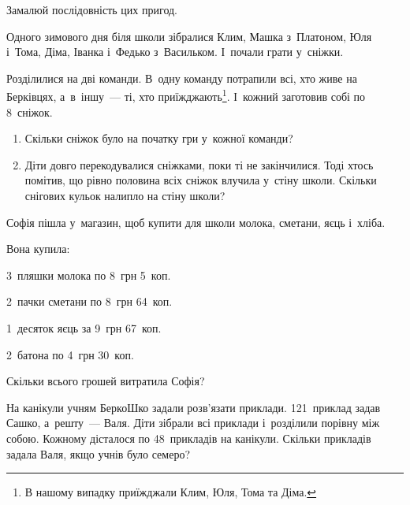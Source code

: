 Замалюй послідовність цих пригод.


\problem
Одного зимового дня біля школи зібралися Клим, Машка з~Платоном, Юля і~Тома,
Діма, Іванка і~Федько з~Васильком. І~почали грати у~сніжки.

Розділилися на дві команди. В~одну команду потрапили всі,
хто живе на Берківцях, а~в~іншу~--- ті, хто приїжджають\footnote{
    В нашому випадку приїжджали Клим, Юля, Тома та Діма.
}.
І~кожний заготовив собі по 8~сніжок.

\begin{enumerate}
    \item Скільки сніжок було на початку гри у~кожної команди?
    \item Діти довго перекодувалися сніжками, поки ті не закінчилися.
    Тоді хтось помітив, що рівно половина всіх сніжок влучила у~стіну школи.
    Скільки снігових кульок налипло на стіну школи?
\end{enumerate}


\problem
Софія пішла у~магазин, щоб купити для школи молока, сметани, яєць і~хліба.

Вона купила:

3~пляшки молока по 8~грн 5~коп.

2~пачки сметани по 8~грн 64~коп.

1~десяток яєць за 9~грн 67~коп.

2~батона по 4~грн 30~коп.

Скільки всього грошей витратила Софія?


\problem
На канікули учням БеркоШко задали розв'язати приклади.
121~приклад задав Сашко, а~решту~--- Валя.
Діти зібрали всі приклади і~розділили порівну між собою.
Кожному дісталося по 48~прикладів на канікули.
Скільки прикладів задала Валя, якщо учнів було семеро?


